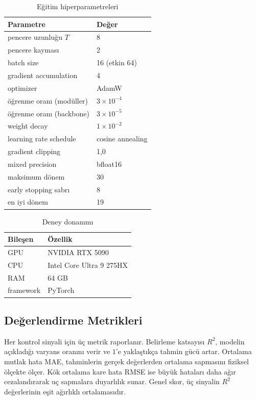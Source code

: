 \documentclass[conference]{IEEEtran}
\begin{document}
\begin{table}[t]
\caption{Eğitim hiperparametreleri}
\label{tab:hparam}
\centering
\footnotesize
\renewcommand{\arraystretch}{1.15}
\begin{tabular}{@{}ll@{}}
\toprule
\textbf{Parametre} & \textbf{Değer} \\
\midrule
pencere uzunluğu $T$ & 8 \\
pencere kayması & 2 \\
batch size & 16 (etkin 64) \\
gradient accumulation & 4 \\
optimizer & AdamW \\
öğrenme oranı (modüller) & $3\times10^{-4}$ \\
öğrenme oranı (backbone) & $3\times10^{-5}$ \\
weight decay & $1\times10^{-2}$ \\
learning rate schedule & cosine annealing \\
gradient clipping & 1,0 \\
mixed precision & bfloat16 \\
maksimum dönem & 30 \\
early stopping sabrı & 8 \\
en iyi dönem & 19 \\
\bottomrule
\end{tabular}
\end{table}

\begin{table}[t]
\caption{Deney donanımı}
\label{tab:hw}
\centering
\footnotesize
\renewcommand{\arraystretch}{1.15}
\begin{tabular}{@{}ll@{}}
\toprule
\textbf{Bileşen} & \textbf{Özellik} \\
\midrule
GPU & NVIDIA RTX 5090 \\
CPU & Intel Core Ultra 9 275HX \\
RAM & 64 GB \\
framework & PyTorch \\
\bottomrule
\end{tabular}
\end{table}

\subsection{Değerlendirme Metrikleri}

Her kontrol sinyali için üç metrik raporlanır. Belirleme katsayısı $R^2$, modelin açıkladığı varyans oranını verir ve $1$'e yaklaştıkça tahmin gücü artar. Ortalama mutlak hata MAE, tahminlerin gerçek değerlerden ortalama sapmasını fiziksel ölçekte ölçer. Kök ortalama kare hata RMSE ise büyük hataları daha ağır cezalandırarak uç sapmalara duyarlılık sunar. Genel skor, üç sinyalin $R^2$ değerlerinin eşit ağırlıklı ortalamasıdır.
\end{document}
